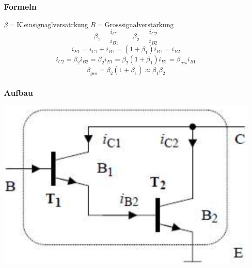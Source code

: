 \begin{minipage}{0.6\linewidth}
    \subsubsection{Formeln}
    \vspace{-0.2cm}
    $ \beta = \text{Kleinsignaglversätrkung}$\newline
    $B = \text{Grosssignalverstärkung}$
    \vspace{-0.2cm}
    \[ \beta_1 = \dfrac{i_{C1}}{i_{B1}} \qquad \beta_2 = \dfrac{i_{C2}}{i_{B2}} \]    
    \[ i_{E1} = i_{C1}+i_{B1}=(1+\beta_1)i_{B1} = i_{B2} \]
    \[ i_{C2} = \beta_2 i_{B2} = \beta_2 i_{E1} = \beta_2 (1 + \beta_1)i_{B1}=\beta_{ges}i_{B1} \]
    \[ \beta_{ges} = \beta_2(1 + \beta_1) \approx \beta_1 \beta_2 \]    
\end{minipage}
\begin{minipage}{0.3\linewidth}
    \subsubsection{Aufbau}
    \includegraphics[width=\linewidth]{images/darlingtonaufbau}
\end{minipage}
 \vspace{-0.2cm}
